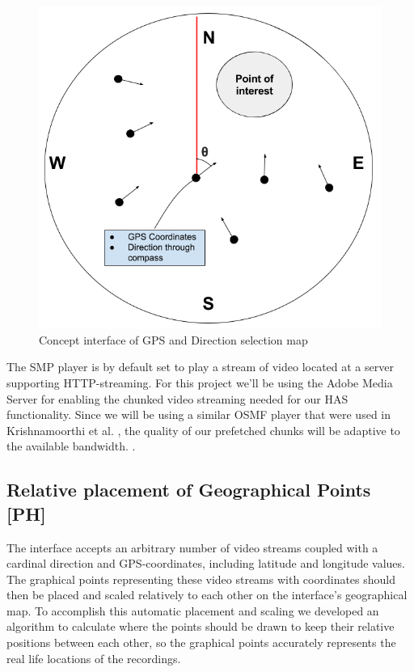 \documentclass[9pt,a4paper]{acmproc}
\begin{document}
\begin{figure}[t!]
\begin{center}
	\includegraphics[scale=0.5]{teomet.png}
	\caption{Concept interface of GPS and Direction selection map}
	\label{fig:gpsinterface}
\end{center}
\end{figure}


The SMP player is by default set to play a stream of video located at a server supporting HTTP-streaming. For this project we'll be using the Adobe Media Server for enabling the chunked video streaming needed for our HAS functionality. Since we will be using a similar OSMF player that were used in Krishnamoorthi et al. \cite{hasmultipath}, the quality of our prefetched chunks will be adaptive to the available bandwidth. \cite{hasmultipath}.

\subsection{Relative placement of Geographical Points [PH]}
The interface accepts an arbitrary number of video streams coupled with a cardinal direction and GPS-coordinates, including latitude and longitude values. The graphical points representing these video streams with coordinates should then be placed and scaled relatively to each other on the interface's geographical map. To accomplish this automatic placement and scaling we developed an algorithm to calculate where the points should be drawn to keep their relative positions between each other, so the graphical points accurately represents the real life locations of the recordings.
\end{document}

